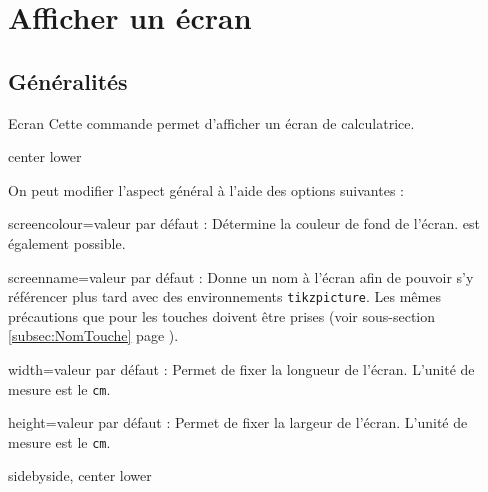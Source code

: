 \documentclass[10pt,french,a4paper]{article}
\begin{document}
\section{Afficher un écran}
\subsection{Généralités}

\begin{docCommand}{Ecran}{}
    Cette commande permet d'afficher un écran de calculatrice.
\end{docCommand}

\begin{dispExample*}{center lower}
\Ecran{}
\end{dispExample*}

On peut modifier l'aspect général à l'aide des options suivantes :

\begin{docKey}{screencolour}{=}{valeur par défaut : }
    Détermine la couleur de fond de l'écran.  est également possible.
\end{docKey}

\begin{docKey}{screenname}{=}{valeur par défaut : }
    Donne un nom à l'écran afin de pouvoir s'y référencer plus tard avec des environnements \texttt{tikzpicture}. Les mêmes précautions que pour les touches doivent être prises (voir sous-section \ref{subsec:NomTouche} page \pageref{subsec:NomTouche}).
\end{docKey}

\begin{docKey}{width}{=}{valeur par défaut : }
Permet de fixer la longueur de l'écran. L'unité de mesure est le \texttt{cm}.
\end{docKey}

\begin{docKey}{height}{=}{valeur par défaut : }
Permet de fixer la largeur de l'écran. L'unité de mesure est le \texttt{cm}.
\end{docKey}

\begin{dispExample*}{sidebyside, center lower}
\Ecran[width=3, height=2, screenname=first]{}
\Ecran[width=3, height=2, screencolour=blue!50, screenname=second]{}
\end{dispExample*}
\end{document}
